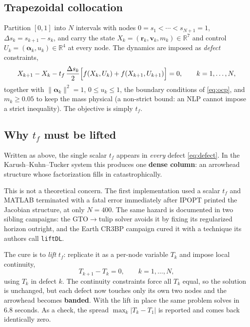 \documentclass[11pt]{article}
\newcommand{\vecr}{\mathbf{r}}
\newcommand{\vecv}{\mathbf{v}}
\newcommand{\bal}{\boldsymbol{\alpha}}
\newcommand{\code}[1]{\texttt{#1}}
\begin{document}
\subsection{Trapezoidal collocation}

Partition $[0,1]$ into $N$ intervals with nodes
$0 = s_1 < \cdots < s_{N+1} = 1$, $\Delta s_k = s_{k+1}-s_k$, and carry the
state $X_k = (\vecr_k, \vecv_k, m_k) \in \mathbb{R}^7$ and control
$U_k = (\bal_k, u_k) \in \mathbb{R}^4$ at every node. The dynamics are imposed
as \emph{defect} constraints,
\begin{equation}
  X_{k+1} - X_k
  - t_f\,\frac{\Delta s_k}{2}\Bigl[ f(X_k,U_k) + f(X_{k+1},U_{k+1}) \Bigr] = 0,
  \qquad k = 1,\dots,N,
\label{eq:defect}
\end{equation}
together with $\lVert \bal_k \rVert^2 = 1$, $0 \le u_k \le 1$, the boundary
conditions of \eqref{eq:ocp}, and $m_k \ge 0.05$ to keep the mass physical (a
non-strict bound: an NLP cannot impose a strict inequality). The
objective is simply $t_f$.

\subsection{Why \texorpdfstring{$t_f$}{tf} must be lifted}
\label{sec:lift}

Written as above, the single scalar $t_f$ appears in \emph{every} defect
\eqref{eq:defect}. In the Karush--Kuhn--Tucker system this produces one
\textbf{dense column}: an arrowhead structure whose factorization fills in
catastrophically.

This is not a theoretical concern. The first implementation used a scalar $t_f$
and MATLAB terminated with a fatal error immediately after IPOPT printed the
Jacobian structure, at only $N = 400$. The same hazard is documented in two
sibling campaigns: the GTO$\to$tulip solver avoids it by fixing its regularized
horizon outright, and the Earth CR3BP campaign cured it with a technique its
authors call \code{liftDL}.

The cure is to \emph{lift} $t_f$: replicate it as a per-node variable $T_k$ and
impose local continuity,
\begin{equation}
  T_{k+1} - T_k = 0, \qquad k = 1,\dots,N,
\label{eq:lift}
\end{equation}
using $T_k$ in defect $k$. The continuity constraints force all $T_k$ equal, so
the solution is unchanged, but each defect now touches only its own two nodes
and the arrowhead becomes \textbf{banded}. With the lift in place the same
problem solves in $6.8$ seconds. As a check, the spread
$\max_k |T_k - T_1|$ is reported and comes back identically zero.
\end{document}
